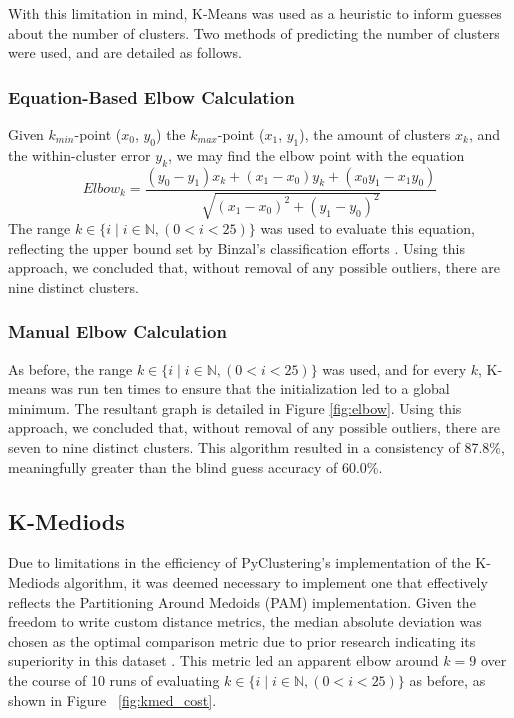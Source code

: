 \documentclass[conference]{IEEEtran}
\begin{document}
With this limitation in mind, K-Means was used as a heuristic to inform guesses about the number of clusters. Two methods of predicting the number of clusters were used, and are detailed as follows.

\subsubsection{Equation-Based Elbow Calculation}
Given $k_{min}$-point ($x_0$, $y_0$) the $k_{max}$-point ($x_1$, $y_1$), the amount of clusters $x_k$, and the within-cluster error $y_k$, we may find the elbow point with the equation
$$
Elbow_{k} = \frac{\left ( y_{0} - y_{1} \right )x_{k} + \left ( x_{1} - x_{0} \right )y_{k} + \left ( x_{0}y_{1} - x_{1}y_{0} \right )}{\sqrt{\left ( x_{1} - x_{0} \right )^{2} + \left ( y_{1} - y_{0} \right )^{2}}}
$$
The range $k \in \{i \mid i \in \mathbb{N}, (0 < i < 25) \}$ was used to evaluate this equation, reflecting the upper bound set by Binzal's classification efforts \cite{binzel_classification}. Using this approach, we concluded that, without removal of any possible outliers, there are nine distinct clusters.


\subsubsection{Manual Elbow Calculation}
As before, the range $k \in \{i \mid i \in \mathbb{N}, (0 < i < 25) \}$ was used, and for every $k$, K-means was run ten times to ensure that the initialization led to a global minimum.
The resultant graph is detailed in Figure \ref{fig:elbow}.
Using this approach, we concluded that, without removal of any possible outliers, there are seven to nine distinct clusters.
This algorithm resulted in a consistency of 87.8\%, meaningfully greater than the blind guess accuracy of 60.0\%.

\subsection{K-Mediods}
Due to limitations in the efficiency of PyClustering's implementation of the K-Mediods algorithm, it was deemed necessary to implement one that effectively reflects the Partitioning Around Medoids (PAM) implementation.
Given the freedom to write custom distance metrics, the median absolute deviation was chosen as the optimal comparison metric due to prior research indicating its superiority in this dataset \cite{hm_gmode}.
This metric led an apparent elbow around $k=9$ over the course of 10 runs of evaluating $k \in \{i \mid i \in \mathbb{N}, (0 < i < 25) \}$ as before, as shown in Figure ~\ref{fig:kmed_cost}.
\end{document}
